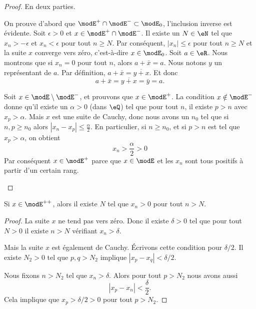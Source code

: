 \begin{proof}
	En deux parties.
	\begin{subproof}
		On prouve d'abord que \( \modE^+\cap\modE^-\subset\modE_0\), l'inclusion inverse est évidente. Soit \( \epsilon>0\) et \( x\in \modE^+\cap\modE^-\). Il existe un \( N\in \eN\) tel que \( x_n>-\epsilon\) et \( x_n<\epsilon\) pour tout \( n\geq N\). Par conséquent, \( | x_n |\leq \epsilon\) pour tout \( n\geq N\) et la suite \( x\) converge vers zéro, c'est-à-dire \( x\in\modE_0\).
		Soit \( a\in \eR\). Nous montrons que si \( x_n=0\) pour tout \( n\), alors \( a+\bar x=a\). Nous notons \( y\) un représentant de \( a\). Par définition, \( a+\bar x=\overline{y+x}\). Et donc
		\begin{equation}
			a+\bar x=\overline{y+x}=\bar y=a.
		\end{equation}

		Soit \( x\in \modE\setminus\modE^-\), et prouvons que \( x\in\modE^+\). La condition \( x\notin \modE^-\) donne qu'il existe un \( \alpha>0\) (dans \( \eQ\)) tel que pour tout \( n\), il existe \( p>n\) avec \( x_p>\alpha\). Mais \( x\) est une suite de Cauchy, donc nous avons un \( n_0\) tel que si \( n,p\geq n_0\) alors \( | x_n-x_p |\leq \frac{ \alpha }{2}\). En particulier, si \( n\geq n_0\), et si \( p>n\) est tel que \( x_p>\alpha\), on obtient
		\begin{equation}
			x_n>\frac{ \alpha }{2}>0
		\end{equation}
		Par conséquent \( x\in\modE^+\) parce que \( x\in\modE\) et les \( x_n \) sont tous positifs à partir d'un certain rang.

	\end{subproof}
\end{proof}

\begin{lemma}        \label{LEMooXNWSooHbNcAV}
	Si \( x\in \modE^{++}\), alors il existe \( N\) tel que \( x_n>0\) pour tout \( n>N\).
\end{lemma}

\begin{proof}
	La suite \( x\) ne tend pas vers zéro. Donc il existe \( \delta>0\) tel que pour tout \( N>0\) il existe \( n>N\) vérifiant \( x_n>\delta\).

	Mais la suite \( x\) est également de Cauchy. Écrivons cette condition pour \( \delta/2\). Il existe \( N_2>0\) tel que \( p,q>N_2\) implique \( | x_p-x_q |<\delta/2\).

	Nous fixons \( n>N_2\) tel que \( x_n>\delta\). Alors pour tout \( p>N_2\) nous avons aussi
	\begin{equation}
		| x_p-x_n |<\frac{ \delta }{2}.
	\end{equation}
	Cela implique que \( x_p>\delta/2>0\) pour tout \( p>N_2\).
\end{proof}

